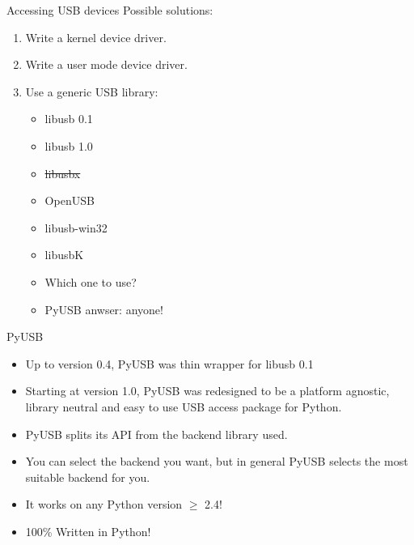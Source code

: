 \documentclass[pdf]{beamer}
\begin{document}
\begin{frame}{Accessing USB devices}
  \transdissolve
  \pause
  Possible solutions:
  \begin{enumerate}
    \pause
    \item Write a kernel device driver.
    \pause
    \item Write a user mode device driver.
    \pause
    \item Use a generic USB library:
      \pause
      \begin{itemize}
          \item libusb 0.1
          \item libusb 1.0
          \item \sout{libusbx}
          \item OpenUSB
          \item libusb-win32
          \item libusbK
      \end{itemize}
      \begin{itemize}
        \pause
        \item Which one to use?
        \pause
        \item PyUSB anwser: anyone!
      \end{itemize}
  \end{enumerate}
\end{frame}

\begin{frame}{PyUSB}
  \transdissolve
  \begin{itemize}
    \item Up to version 0.4, PyUSB was thin wrapper for libusb 0.1
    \item Starting at version 1.0, PyUSB was redesigned to be a
      platform agnostic, library neutral and easy to use USB access
      package for Python.
    \item PyUSB splits its API from the backend library used.
    \item You can select the backend you want, but in general PyUSB
      selects the most suitable backend for you.
    \item It works on any Python version $\ge$ 2.4!
    \item 100\% Written in Python!
  \end{itemize}
\end{frame}
\end{document}
